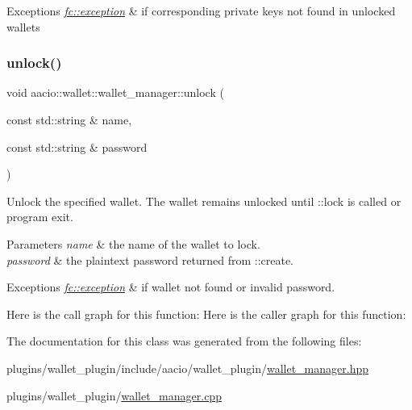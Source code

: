 \begin{DoxyExceptions}{Exceptions}
{\em \mbox{\hyperlink{classfc_1_1exception}{fc\+::exception}}} & if corresponding private keys not found in unlocked wallets \\
\hline
\end{DoxyExceptions}
\mbox{\label{classaacio_1_1wallet_1_1wallet__manager_a9ba50fc7c2965c28ccbdeaf82bf818e1}} 
\subsubsection{\texorpdfstring{unlock()}{unlock()}}
{\footnotesize\ttfamily void aacio\+::wallet\+::wallet\+\_\+manager\+::unlock (\begin{DoxyParamCaption}\item[{const std\+::string \&}]{name,  }\item[{const std\+::string \&}]{password }\end{DoxyParamCaption})}

Unlock the specified wallet. The wallet remains unlocked until \+::lock is called or program exit. 
\begin{DoxyParams}{Parameters}
{\em name} & the name of the wallet to lock. \\
\hline
{\em password} & the plaintext password returned from \+::create. \\
\hline
\end{DoxyParams}

\begin{DoxyExceptions}{Exceptions}
{\em \mbox{\hyperlink{classfc_1_1exception}{fc\+::exception}}} & if wallet not found or invalid password. \\
\hline
\end{DoxyExceptions}
Here is the call graph for this function\+:
Here is the caller graph for this function\+:


The documentation for this class was generated from the following files\+:\begin{DoxyCompactItemize}
\item 
plugins/wallet\+\_\+plugin/include/aacio/wallet\+\_\+plugin/\mbox{\hyperlink{wallet__manager_8hpp}{wallet\+\_\+manager.\+hpp}}\item 
plugins/wallet\+\_\+plugin/\mbox{\hyperlink{wallet__manager_8cpp}{wallet\+\_\+manager.\+cpp}}\end{DoxyCompactItemize}
